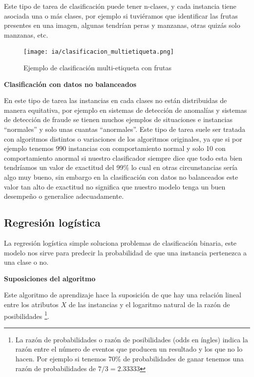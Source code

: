 \documentclass[11pt,fleqn]{book} %
\begin{document}
Este tipo de tarea de clasificación puede tener n-clases, y cada instancia tiene asociada una o más clases, por ejemplo si tuviéramos que identificar las frutas presentes en una imagen, algunas tendrían peras y manzanas, otras quizás solo manzanas, etc.

\begin{figure}[ht]
\centering\texttt{[image: ia/clasificacion\_multietiqueta.png]}
\caption{Ejemplo de clasificación multi-etiqueta con frutas}

\label{fig:clasificacion_multietiqueta} 
\end{figure}

\FloatBarrier


\textbf{Clasificación con datos no balanceados}

En este tipo de tarea las instancias en cada clases no están distribuidas de manera equitativa, por ejemplo en sistemas de detección de anomalías y sistemas de detección de fraude se tienen muchos ejemplos de situaciones e instancias ``normales'' y solo unas cuantas ``anormales''.
Este tipo de tarea suele ser tratada con algoritmos distintos o variaciones de los algoritmos originales, ya que si por ejemplo tenemos 990 instancias con comportamiento normal y solo 10 con comportamiento anormal si nuestro clasificador siempre dice que todo esta bien tendríamos un valor de exactitud del 99\% lo cual en otras circunstancias sería algo muy bueno, sin embargo en la clasificación  con datos no balanceados este valor tan alto de exactitud no significa que nuestro modelo tenga un buen desempeño o generalice adecuadamente.

\subsection{Regresión logística} 

La regresión logística simple soluciona problemas de clasificación binaria, este modelo nos sirve para predecir la probabilidad de que una instancia pertenezca a una clase o no.

\textbf{Suposiciones del algoritmo}

Este algoritmo de aprendizaje hace la suposición de que hay una relación lineal entre los atributos $X$ de las instancias y el logaritmo natural de la razón de posibilidades \footnote{La razón de probabilidades o razón de posibilidades (odds en íngles) indica la razón entre el número de eventos que producen un resultado y los que no lo hacen.  Por ejemplo si tenemos 70\% de probabilidades de ganar tenemos una razón de probabilidades de $7/3 = 2.33333$ }. 
\end{document}
